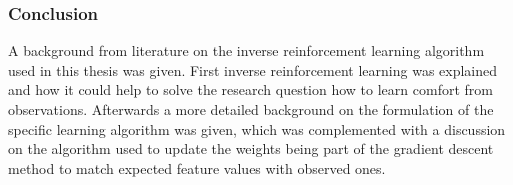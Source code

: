 %
%

\subsubsection{Conclusion}
A background from literature on the inverse reinforcement learning algorithm used in this thesis was given. First inverse reinforcement learning was explained and how it could help to solve the research question how to learn comfort from observations. Afterwards a more detailed background on the formulation of the specific learning algorithm was given, which was complemented with a discussion on the algorithm used to update the weights being part of the gradient descent method to match expected feature values with observed ones.
\newpage


%



